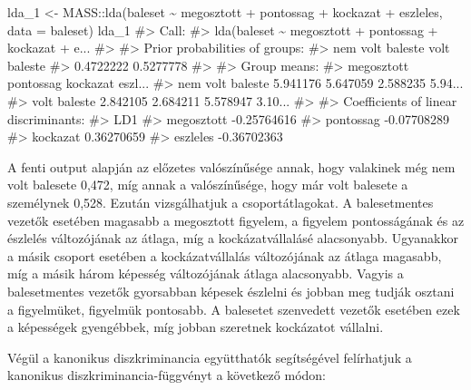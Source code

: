 \documentclass[
  letterpaper,
]{krantz}
\makeatletter
\newenvironment{Shaded}{\begin{snugshade}}{\end{snugshade}}
\newcommand{\AttributeTok}[1]{\textcolor[rgb]{0.40,0.45,0.13}{#1}}
\newcommand{\CommentTok}[1]{\textcolor[rgb]{0.37,0.37,0.37}{#1}}
\newcommand{\FunctionTok}[1]{\textcolor[rgb]{0.28,0.35,0.67}{#1}}
\newcommand{\NormalTok}[1]{\textcolor[rgb]{0.00,0.23,0.31}{#1}}
\newcommand{\OtherTok}[1]{\textcolor[rgb]{0.00,0.23,0.31}{#1}}
\newcommand{\SpecialCharTok}[1]{\textcolor[rgb]{0.37,0.37,0.37}{#1}}
\newenvironment{kframe}{%
\medskip{}
\setlength{\fboxsep}{.8em}
 \def\at@end@of@kframe{}%
 \ifinner\ifhmode%
  \def\at@end@of@kframe{\end{minipage}}%
  \begin{minipage}{\columnwidth}%
 \fi\fi%
 \def\FrameCommand##1{\hskip\@totalleftmargin \hskip-\fboxsep
 \colorbox{shadecolor}{##1}\hskip-\fboxsep
     \hskip-\linewidth \hskip-\@totalleftmargin \hskip\columnwidth}%
 \MakeFramed {\advance\hsize-\width
   \@totalleftmargin\z@ \linewidth\hsize
   \@setminipage}}%
 {\par\unskip\endMakeFramed%
 \at@end@of@kframe}
\renewenvironment{Shaded}{\begin{kframe}}{\end{kframe}}
\makeatother
\begin{document}
\begin{Shaded}
\begin{Highlighting}[]
\NormalTok{lda\_1 }\OtherTok{\textless{}{-}}\NormalTok{ MASS}\SpecialCharTok{::}\FunctionTok{lda}\NormalTok{(baleset }\SpecialCharTok{\textasciitilde{}}\NormalTok{ megosztott }\SpecialCharTok{+}\NormalTok{ pontossag }\SpecialCharTok{+}\NormalTok{ kockazat }\SpecialCharTok{+}
\NormalTok{    eszleles, }\AttributeTok{data =}\NormalTok{ baleset)}
\NormalTok{lda\_1}
\CommentTok{\#\textgreater{} Call:}
\CommentTok{\#\textgreater{} lda(baleset \textasciitilde{} megosztott + pontossag + kockazat + e...}
\CommentTok{\#\textgreater{} }
\CommentTok{\#\textgreater{} Prior probabilities of groups:}
\CommentTok{\#\textgreater{} nem volt baleste     volt baleste }
\CommentTok{\#\textgreater{}        0.4722222        0.5277778 }
\CommentTok{\#\textgreater{} }
\CommentTok{\#\textgreater{} Group means:}
\CommentTok{\#\textgreater{}                  megosztott pontossag kockazat eszl...}
\CommentTok{\#\textgreater{} nem volt baleste   5.941176  5.647059 2.588235 5.94...}
\CommentTok{\#\textgreater{} volt baleste       2.842105  2.684211 5.578947 3.10...}
\CommentTok{\#\textgreater{} }
\CommentTok{\#\textgreater{} Coefficients of linear discriminants:}
\CommentTok{\#\textgreater{}                    LD1}
\CommentTok{\#\textgreater{} megosztott {-}0.25764616}
\CommentTok{\#\textgreater{} pontossag  {-}0.07708289}
\CommentTok{\#\textgreater{} kockazat    0.36270659}
\CommentTok{\#\textgreater{} eszleles   {-}0.36702363}
\end{Highlighting}
\end{Shaded}

A fenti output alapján az előzetes valószínűsége annak, hogy valakinek
még nem volt balesete 0,472, míg annak a valószínűsége, hogy már volt
balesete a személynek 0,528. Ezután vizsgálhatjuk a csoportátlagokat. A
balesetmentes vezetők esetében magasabb a megosztott figyelem, a
figyelem pontosságának és az észlelés változójának az átlaga, míg a
kockázatvállalásé alacsonyabb. Ugyanakkor a másik csoport esetében a
kockázatvállalás változójának az átlaga magasabb, míg a másik három
képesség változójának átlaga alacsonyabb. Vagyis a balesetmentes vezetők
gyorsabban képesek észlelni és jobban meg tudják osztani a figyelmüket,
figyelmük pontosabb. A balesetet szenvedett vezetők esetében ezek a
képességek gyengébbek, míg jobban szeretnek kockázatot vállalni.

Végül a kanonikus diszkriminancia együtthatók segítségével felírhatjuk a
kanonikus diszkriminancia-függvényt a következő módon:
\end{document}
